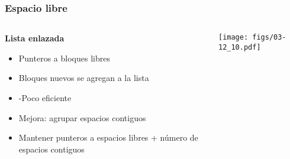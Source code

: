 \documentclass[letter]{beamer}
\begin{document}
\begin{frame}
  \frametitle{Espacio libre}

  \begin{columns}[c]
    \begin{column}[T]{6cm}
      {\bf Lista enlazada}
        \begin{itemize}
          \item Punteros a bloques libres
          \item Bloques nuevos se agregan a la lista
          \item -Poco eficiente
          \item <2-> Mejora: agrupar espacios contiguos
          \item <3-> Mantener punteros a espacios libres + número de espacios contiguos
        \end{itemize}
    \end{column}
    \begin{column}[T]{6cm}
      \begin{center}
        \texttt{[image: figs/03-12\_10.pdf]}
      \end{center}
    \end{column}
  \end{columns}
\end{frame}


\end{document}
